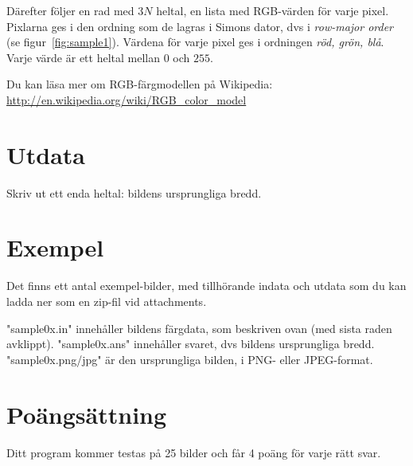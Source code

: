 Därefter följer en rad med $3N$ heltal, en lista med RGB-värden för varje pixel.
Pixlarna ges i den ordning som de lagras i Simons dator, dvs i \emph{row-major
order} (se figur~\ref{fig:sample1}). Värdena för varje pixel ges i ordningen \emph{röd,
grön, blå}. Varje värde är ett heltal mellan $0$ och $255$.

Du kan läsa mer om RGB-färgmodellen på Wikipedia: \url{http://en.wikipedia.org/wiki/RGB_color_model}

\section*{Utdata}
Skriv ut ett enda heltal: bildens ursprungliga bredd.

\section*{Exempel}
Det finns ett antal exempel-bilder, med tillhörande indata och utdata som du
kan ladda ner som en zip-fil vid attachments.

"sample0x.in" innehåller bildens färgdata, som beskriven ovan (med sista raden avklippt).
"sample0x.ans" innehåller svaret, dvs bildens ursprungliga bredd.
"sample0x.png/jpg" är den ursprungliga bilden, i PNG- eller JPEG-format.

\section*{Poängsättning}
Ditt program kommer testas på 25 bilder och får 4 poäng för varje rätt svar.
